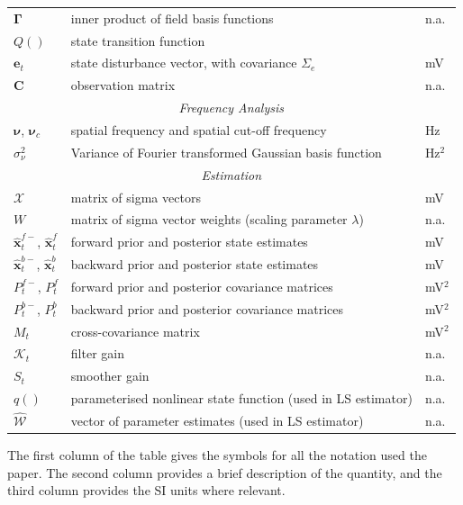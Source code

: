 \documentclass[10pt]{article}
\begin{document}
\begin{table}[!ht]
\begin{tabular}{|l|l|l|}
   	$\boldsymbol{\Gamma}$ & inner product of field basis functions & n.a.\\
   	$Q()$ & state transition function &\\
   	$\mathbf{e}_t$ & state disturbance vector, with covariance $\Sigma_e$ & mV\\
   	$\mathbf{C}$ & observation matrix & n.a. \\
	\hline
	\multicolumn{3}{|c|}{\emph{Frequency Analysis}} \\
	\hline
	$\boldsymbol{\nu}$, $\boldsymbol{\nu}_c$ & spatial frequency and spatial cut-off frequency & Hz \\
	$\sigma_{\nu}^2$ & Variance of Fourier transformed Gaussian basis function & Hz$^2$\\
	\hline
	\multicolumn{3}{|c|}{\emph{Estimation}} \\
	\hline
	$\mathcal{X}$ & matrix of sigma vectors & mV\\
	$W$ & matrix of sigma vector weights (scaling parameter $\lambda$) & n.a.\\
   	$\hat{\mathbf{x}}_t^{f-}$, $\hat{\mathbf{x}}_t^f$ & forward prior and posterior state estimates & mV\\
   	$\hat{\mathbf{x}}_t^{b-}$, $\hat{\mathbf{x}}_t^{b}$ & backward prior and posterior state estimates & mV\\
 	$P^{f-}_t$, $P^f_t$  & forward prior and posterior covariance matrices & mV$^2$\\
   	$P^{b-}_t$, $P^b_t$ & backward prior and posterior covariance matrices & mV$^2$\\
	$M_t$& cross-covariance matrix & mV$^2$\\
	$\mathcal K_{t} $ & filter gain & n.a.\\
	$S_t$ & smoother gain & n.a.\\
	$q()$ & parameterised nonlinear state function (used in LS estimator) & n.a.\\
   	$\mathcal{\hat{W}}$& vector of parameter estimates (used in LS estimator) & n.a.\\	
	\hline
\end{tabular}
\begin{flushleft}The first column of the table gives the symbols for all the notation used the paper. The second column provides a brief description of the quantity, and the third column provides the SI units where relevant.
\end{flushleft}
\label{tab:label}
\end{table}
\end{document}
